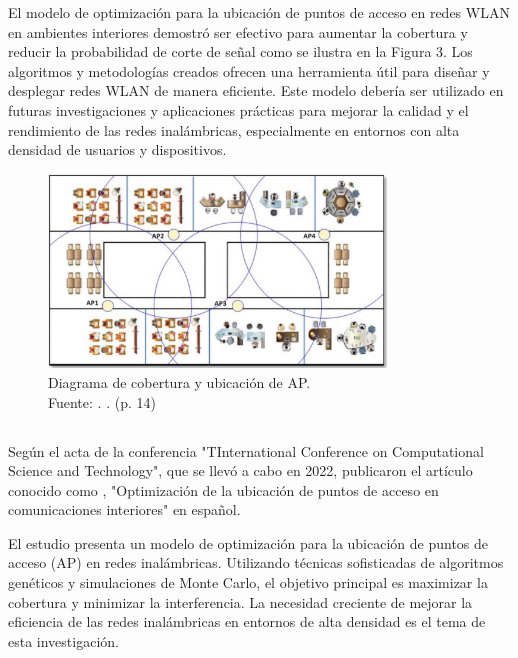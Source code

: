 El modelo de optimización para la ubicación de puntos de acceso en redes WLAN en ambientes interiores demostró ser efectivo para aumentar la cobertura y reducir la probabilidad de corte de señal como se ilustra en la Figura 3. Los algoritmos y metodologías creados ofrecen una herramienta útil para diseñar y desplegar redes WLAN de manera eficiente. Este modelo debería ser utilizado en futuras investigaciones y aplicaciones prácticas para mejorar la calidad y el rendimiento de las redes inalámbricas, especialmente en entornos con alta densidad de usuarios y dispositivos.

\begin{figure}[!ht]
	\begin{center}
		\includegraphics[width=0.80\textwidth]{2/figures/contreras2021.png}
		\caption[Diagrama de cobertura y ubicación de AP]{Diagrama de cobertura y ubicación de AP.\\
			Fuente: \cite{pr_contreras2021modelwlan}. . (p. 14)}
		\label{2:fig111}
	\end{center}
\end{figure}

\subsection{}
Según el acta de la conferencia "TInternational Conference on Computational Science and Technology", que se llevó a cabo en 2022, \cite{pr_alathari2023optaps} publicaron el artículo conocido como , "Optimización de la ubicación de puntos de acceso en comunicaciones interiores" en español.

El estudio presenta un modelo de optimización para la ubicación de puntos de acceso (AP) en redes inalámbricas. Utilizando técnicas sofisticadas de algoritmos genéticos y simulaciones de Monte Carlo, el objetivo principal es maximizar la cobertura y minimizar la interferencia. La necesidad creciente de mejorar la eficiencia de las redes inalámbricas en entornos de alta densidad es el tema de esta investigación.

